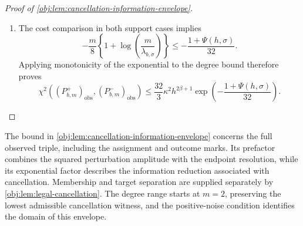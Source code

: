 \documentclass[11pt]{article}
\begin{document}
\begin{proof}[Proof of \cref{obj:lem:cancellation-information-envelope}]
\begin{enumerate}
Finally, suppose that \(\sigma>h\) and \(h<\sigma^4\). The scale identity gives
\[
\sigma^4m^2=4096b^4,
\qquad
b<\sigma^4m^2=4096b^4.
\]
These inequalities force \(b\ge1/16\): if \(b<1/16\), then
\[
b^3\le\frac1{4096},
\qquad
4096b^4\le b,
\]
contradicting the strict inequality above. Therefore
\[
\sqrt h=\frac{\sqrt b}{m}\ge\frac1{4m},
\qquad
h^{-1/2}=\frac1{\sqrt h}\le4m.
\]
On the other hand, \(0<b\le1\) implies
\[
b^3\le1,\qquad b^4\le b,\qquad b^2\le\sqrt b.
\]
Consequently, the logarithm's argument satisfies
\[
0<
\frac{\sigma^2}{\sqrt h}
=\frac{\sigma^2m}{\sqrt b}
=\frac{64b^2}{\sqrt b}
\le64\le256.
\]
Monotonicity of the logarithm and \(1+\log256\ge0\) now give
\[
\begin{aligned}
1+\Psi(h,\sigma)
&=h^{-1/2}\left\{1+\log\!\left(\frac{\sigma^2}{\sqrt h}\right)\right\}\\
&\le h^{-1/2}(1+\log256)\\
&\le4m(1+\log256).
\end{aligned}
\]
Thus every unsaturated branch satisfies
\[
1+\Psi(h,\sigma)
\le
4m\left\{1+\log\!\left(\frac{m}{\lambda_{b,\sigma}}\right)\right\}.
\]
The weak inequalities in the first two branches include their boundary values.

\item The cost comparison in both support cases implies
\[
-\frac m8\left\{1+\log\!\left(\frac{m}{\lambda_{b,\sigma}}\right)\right\}
\le-\frac{1+\Psi(h,\sigma)}{32}.
\]
Applying monotonicity of the exponential to the degree bound therefore proves
\[
\chi^2\!\left((P^+_{b,m})_{\mathrm{obs}},
             (P^-_{b,m})_{\mathrm{obs}}\right)
\le
\frac{32}{3}\kappa^2h^{2\beta+1}
\exp\!\left(-\frac{1+\Psi(h,\sigma)}{32}\right).
\]
\end{enumerate}
\end{proof}

The bound in \cref{obj:lem:cancellation-information-envelope} concerns the full observed triple, including the assignment and outcome marks. Its prefactor combines the squared perturbation amplitude with the endpoint resolution, while its exponential factor describes the information reduction associated with cancellation. Membership and target separation are supplied separately by \cref{obj:lem:legal-cancellation}. The degree range starts at \(m=2\), preserving the lowest admissible cancellation witness, and the positive-noise condition identifies the domain of this envelope.
\end{document}

